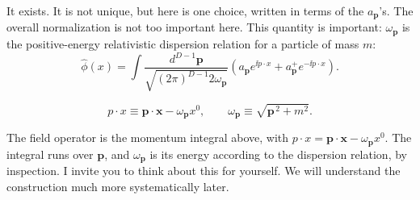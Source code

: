It exists. It is not unique, but here is one choice, written in terms of the
$a_{\mathbf p}$'s.
The overall normalization is not too important here. This quantity is
important: $\omega_{\mathbf p}$ is the positive-energy relativistic dispersion
relation for a particle of mass $m$:
\begin{equation}
  \hat\phi(x)=
  \int\frac{d^{D-1}\mathbf p}
  {\sqrt{(2\pi)^{D-1}2\omega_{\mathbf p}}}
  \left(
    a_{\mathbf p}e^{\ii p\cdot x}
    +a_{\mathbf p}^{+}e^{-\ii p\cdot x}
  \right).
  \label{eq:253a-free-scalar-expansion}
\end{equation}

\begin{equation}
  p\cdot x\equiv\mathbf p\cdot\mathbf x-\omega_{\mathbf p}x^0,
  \qquad
  \omega_{\mathbf p}\equiv\sqrt{\mathbf p^{\,2}+m^2}.
  \label{eq:253a-free-scalar-definitions}
\end{equation}

The field operator is the momentum integral above, with $p\cdot
x=\mathbf p\cdot\mathbf x-\omega_{\mathbf p}x^0$.
The integral runs over $\mathbf p$, and $\omega_{\mathbf p}$ is its energy
according to the dispersion relation, by inspection.
I invite you to think about this for yourself. We will understand the
construction much more systematically later.


